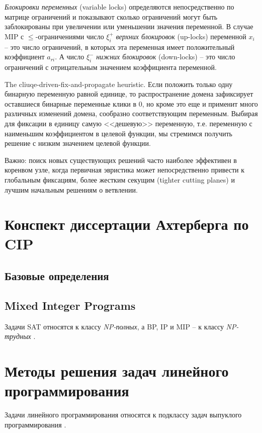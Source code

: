 \documentclass[%
	11pt,
	a4paper,
	utf8,
		]{article}
\begin{document}
\emph{Блокировки переменных} (variable locks) определяются непосредственно по матрице ограничений и показывают сколько ограничений могут быть заблокированы при увеличении или уменьшении значения переменной. В случае MIP с $ \leqslant $-ограничениями число $ \xi_i^{+} $ \emph{верхних блокировок} (up-locks) переменной $ x_i $ -- это число ограничений, в которых эта переменная имеет положительный коэффициент $ a_{ri} $. А число $ \xi_i^{-} $ \emph{нижних блокировок} (down-locks) -- это число ограничений с отрицательным значением коэффициента переменной.

The cliuqe-driven-fix-and-propagate heuristic. Если положить только одну бинарную переменную равной единице, то распространение домена зафиксирует оставшиеся бинарные переменные клики в 0, но кроме это еще и применит много различных изменений домена, сообразно соответствующим переменным. Выбирая для фиксации в единицу самую <<дешевую>> переменную, т.е. переменную с наименьшим коэффициентом в целевой функции, мы стремимся получить решение с низким значением целевой функции.

Важно: поиск новых существующих решений часто наиболее эффективен в коренвом узле, когда первичная эвристика может непосредственно привести к глобальным фиксациям, более жестким секущим (tighter cutting planes) и лучшим начальным решениям о ветвлении.


\section{Конспект диссертации Ахтерберга по CIP}

\subsection{Базовые определения}

\subsection{Mixed Integer Programs}

Задачи SAT относятся к классу \emph{NP-полных}, а BP, IP и MIP -- к классу \emph{NP-трудных} \cite[]{achterberg:constr_int_prog}.

\section{Методы решения задач линейного программирования}

Задачи линейного программирования относятся к подклассу задач выпуклого программирования \cite[]{vorontsova:convex_opt-2021}.
\end{document}
